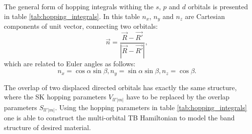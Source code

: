 The general form of hopping integrals withing the $s$, $p$ and $d$ orbitals is presented in table \ref{tab:hopping_integrals}. In this table $n_x$, $n_y$ and $n_z$ are Cartesian components of unit vector, connecting two orbitals:
\begin{equation}
	\vec{n} = \frac{\vec{R} - \vec{R'}}{|\vec{R} - \vec{R'}|},
\end{equation}
which are related to Euler angles as follows:
\begin{equation}
	n_x =\cos{\alpha} \sin{\beta}, n_y = \sin{\alpha} \sin{\beta}, n_z = \cos{\beta}. 
\end{equation}

The overlap of two displaced directed orbitals has exactly the same structure, where the SK hopping parameters $V_{l l' |m|}$ have to be replaced by the overlap parameters $S_{l l' |m|}$. Using the hopping parameters in table \ref{tab:hopping_integrals} one is able to construct the multi-orbital TB Hamiltonian to model the band structure of desired material.

